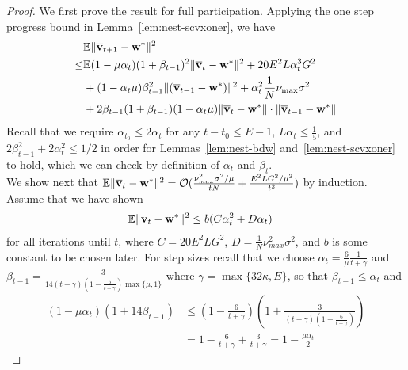 \begin{proof}
We first prove the result for full participation. Applying the one step progress bound in Lemma~\ref{lem:nest-scvxoner}, we have
\begin{align*}
&\mathbb{E}\|{\overline{\mathbf{v}}}_{t+1}-{\mathbf{w}}^{\ast}\|^{2} \\
\leq &\mathbb{E}(1-\mu\alpha_{t})(1+\beta_{t-1})^{2}\|{\overline{\mathbf{v}}}_{t}-{\mathbf{w}}^{\ast}\|^{2}+20E^{2}L\alpha_{t}^{3}G^{2}\\
&+(1-\alpha_{t}\mu)\beta_{t-1}^{2}\|({\overline{\mathbf{v}}}_{t-1}-{\mathbf{w}}^{\ast})\|^{2} +\alpha_{t}^{2}\frac{1}{N}\nu_{\max}\sigma^{2}\\
&+2\beta_{t-1}(1+\beta_{t-1})(1-\alpha_{t}\mu)\|{\overline{\mathbf{v}}}_{t}-{\mathbf{w}}^{\ast}\|\cdot\|{\overline{\mathbf{v}}}_{t-1}-{\mathbf{w}}^{\ast}\|
\end{align*}
Recall that we require $\alpha_{t_{0}}\leq2\alpha_{t}$ for any
$t-t_{0}\leq E-1$, $L\alpha_{t}\leq\frac{1}{5}$, and $2\beta_{t-1}^{2}+2\alpha_{t}^{2}\leq1/2$ in order for Lemmas~\ref{lem:nest-bdw} and~\ref{lem:nest-scvxoner} to hold,
which we can check by definition of $\alpha_{t}$ and
$\beta_{t}$.\\
 We show next that $\mathbb{E}\|{\overline{\mathbf{v}}}_{t}-{\mathbf{w}}^{\ast}\|^{2}=\mathcal{O}(\frac{\nu_{max}^{2}\sigma^{2}/\mu}{tN}+\frac{E^{2}LG^{2}/\mu^2}{t^{2}})$ 
by induction. Assume that we have shown 
\begin{align*}
\mathbb{E}\|{\overline{\mathbf{v}}}_{t}-{\mathbf{w}}^{\ast}\|^{2} & \leq b(C\alpha_{t}^{2}+D\alpha_{t})
\end{align*}
for all iterations until $t$, where $C=20E^{2}LG^{2}$, $D=\frac{1}{N}\nu_{max}^{2}\sigma^{2}$,
and $b$ is some constant to be chosen later. For step sizes recall that we choose $\alpha_{t}=\frac{6}{\mu}\frac{1}{t+\gamma}$
and $\beta_{t-1}=\frac{3}{14(t+\gamma)(1-\frac{6}{t+\gamma})\max\{\mu,1\}}$
where $\gamma=\max\{32\kappa,E\}$, so that $\beta_{t-1}\leq\alpha_{t}$
and 
\begin{align*}
(1-\mu\alpha_{t})(1+14\beta_{t-1}) & \leq(1-\frac{6}{t+\gamma})(1+\frac{3}{(t+\gamma)(1-\frac{6}{t+\gamma})})\\
& =1-\frac{6}{t+\gamma}+\frac{3}{t+\gamma}=1-\frac{\mu\alpha_{t}}{2}
\end{align*}


\end{proof}
